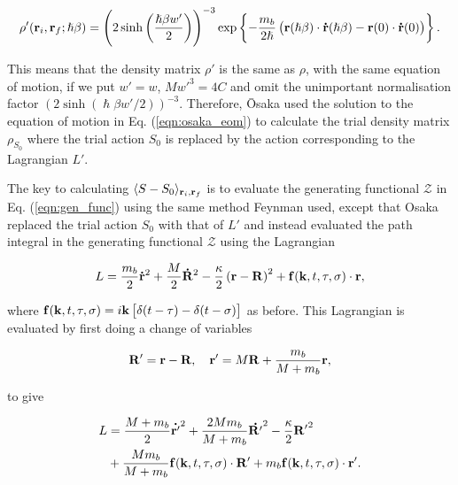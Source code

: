 \begin{equation}
    \rho'(\vb{r}_i, \vb{r}_f; \hslash\beta) = \left(2 \sinh\left(\frac{\hslash\beta w'}{2}\right)\right)^{-3} \exp \left\{-\frac{m_b}{2\hslash}\left( \vb{r}(\hslash\beta) \cdot \vb{\dot{r}}(\hslash\beta) - \vb{r}(0) \cdot \vb{\dot{r}}(0) \right)\right\}.
\end{equation}

This means that the density matrix $\rho'$ is the same as $\rho$, with the same equation of motion, if we put $w' = w$, $Mw'^3 = 4C$ and omit the unimportant normalisation factor $(2 \sinh (\hslash \beta w' / 2))^{-3}$. Therefore, \=Osaka used the solution to the equation of motion in Eq. (\ref{eqn:osaka_eom}) to calculate the trial density matrix $\rho_{S_0}$ where the trial action $S_0$ is replaced by the action corresponding to the Lagrangian $L'$. 

The key to calculating $\langle S - S_0 \rangle_{\vb{r}_i, \vb{r}_f}$ is to evaluate the generating functional $\mathcal{Z}$ in Eq. (\ref{eqn:gen_func}) using the same method Feynman used, except that Osaka replaced the trial action $S_0$ with that of $L'$ and instead evaluated the path integral in the generating functional $\mathcal{Z}$ using the Lagrangian

\begin{equation}\label{eqn:osaka_lag_f}
    L = \frac{m_b}{2} \vb{\dot{r}}^2 + \frac{M}{2}\vb{\dot{R}}^2 - \frac{\kappa}{2} \left( \vb{r} - \vb{R} \right)^2 + \vb{f}(\vb{k}, t, \tau, \sigma) \cdot \vb{r},
\end{equation}

where $\vb{f}(\vb{k}, t, \tau, \sigma) = i \vb{k} \left[ \delta(t-\tau) - \delta(t-\sigma) \right]$ as before. This Lagrangian is evaluated by first doing a change of variables

\begin{equation}
    \vb{R'} = \vb{r} - \vb{R}, \quad \vb{r'} = M \vb{R} + \frac{m_b}{M + m_b} \vb{r},
\end{equation}

to give

\begin{equation}
    \begin{aligned}
        L &= \frac{M+m_b}{2} \vb{\dot{r'}}^2 + \frac{2M m_b}{M+m_b} \vb{\dot{R'}}^2 - \frac{\kappa}{2}\vb{R'}^2 \\
        &+\frac{M m_b}{M+m_b} \vb{f}(\vb{k}, t, \tau, \sigma) \cdot \vb{R'} + m_b \vb{f}(\vb{k}, t, \tau, \sigma) \cdot \vb{r'}.
    \end{aligned}
\end{equation}

